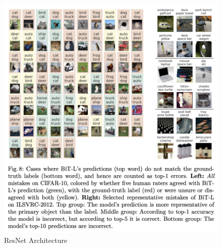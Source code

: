 \documentclass[UTF8]{report}
\theoremstyle{MyLineTheoremStyle} %
\theoremstyle{MyBlockTheoremStyle} %
\theoremstyle{MySubsubsectionStyle} %
\begin{document}
\begin{figure}[H]
    \centering
    \includegraphics[width=1.0\textwidth]{ResNet.png}
    \caption{ResNet Architecture}
    \label{fig:resnet_architecture}
\end{figure}
\end{document}

